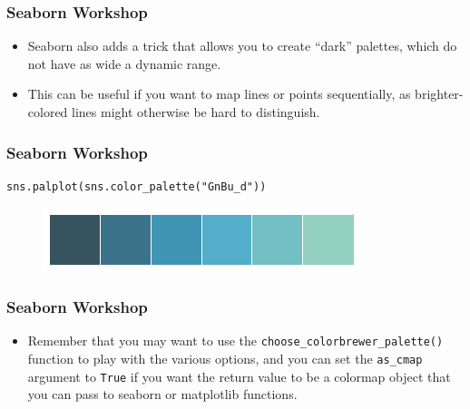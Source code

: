 \documentclass{beamer}
\begin{document}
\begin{frame}[fragile]
	\frametitle{Seaborn Workshop}
	\large
\begin{itemize}
\item Seaborn also adds a trick that allows you to create “dark” palettes, which do not have as wide a dynamic range. 
\item This can be useful if you want to map lines or points sequentially, as brighter-colored lines might otherwise be hard to distinguish.
\end{itemize}

\end{frame}
\begin{frame}[fragile]
	\frametitle{Seaborn Workshop}
	\large
	
\begin{verbatim}
sns.palplot(sns.color_palette("GnBu_d"))
\end{verbatim}

\begin{figure}
	\centering
	\includegraphics[width=0.7\linewidth]{images/color_palettes_29_0}
\end{figure}
\end{frame}
\begin{frame}[fragile]
	\frametitle{Seaborn Workshop}
	\large
	\begin{itemize}
\item Remember that you may want to use the \texttt{choose\_colorbrewer\_palette()} function to play with the various options, and you can set the \texttt{as\_cmap} argument to \texttt{True} if you want the return value to be a colormap object that you can pass to seaborn or matplotlib functions.
	\end{itemize}

\end{frame}
\end{document}
